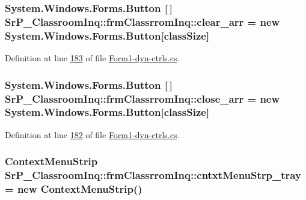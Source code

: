 \hypertarget{class_sr_p___classroom_inq_1_1frm_classrrom_inq_a1c427c3d5bb61c96ca798e5f6aaff8f4}{
\subsubsection[{clear\-\_\-arr}]{\setlength{\rightskip}{0pt plus 5cm}\-System.\-Windows.\-Forms.\-Button \mbox{[}$\,$\mbox{]} {\bf \-Sr\-P\-\_\-\-Classroom\-Inq\-::frm\-Classrrom\-Inq\-::clear\-\_\-arr} = new \-System.\-Windows.\-Forms.\-Button\mbox{[}{\bf class\-Size}\mbox{]}}}
\label{class_sr_p___classroom_inq_1_1frm_classrrom_inq_a1c427c3d5bb61c96ca798e5f6aaff8f4}


\-Definition at line \hyperlink{_form1-dyn-ctrls_8cs_source_l00183}{183} of file \hyperlink{_form1-dyn-ctrls_8cs_source}{\-Form1-\/dyn-\/ctrls.\-cs}.

\hypertarget{class_sr_p___classroom_inq_1_1frm_classrrom_inq_a4758f35d344b79b972e88a42cb660904}{
\subsubsection[{close\-\_\-arr}]{\setlength{\rightskip}{0pt plus 5cm}\-System.\-Windows.\-Forms.\-Button \mbox{[}$\,$\mbox{]} {\bf \-Sr\-P\-\_\-\-Classroom\-Inq\-::frm\-Classrrom\-Inq\-::close\-\_\-arr} = new \-System.\-Windows.\-Forms.\-Button\mbox{[}{\bf class\-Size}\mbox{]}}}
\label{class_sr_p___classroom_inq_1_1frm_classrrom_inq_a4758f35d344b79b972e88a42cb660904}


\-Definition at line \hyperlink{_form1-dyn-ctrls_8cs_source_l00182}{182} of file \hyperlink{_form1-dyn-ctrls_8cs_source}{\-Form1-\/dyn-\/ctrls.\-cs}.

\hypertarget{class_sr_p___classroom_inq_1_1frm_classrrom_inq_a5546b3f80dfce3dbcd3e81732f28dc6d}{
\subsubsection[{cntxt\-Menu\-Strp\-\_\-tray}]{\setlength{\rightskip}{0pt plus 5cm}\-Context\-Menu\-Strip {\bf \-Sr\-P\-\_\-\-Classroom\-Inq\-::frm\-Classrrom\-Inq\-::cntxt\-Menu\-Strp\-\_\-tray} = new \-Context\-Menu\-Strip()}}
\label{class_sr_p___classroom_inq_1_1frm_classrrom_inq_a5546b3f80dfce3dbcd3e81732f28dc6d}


